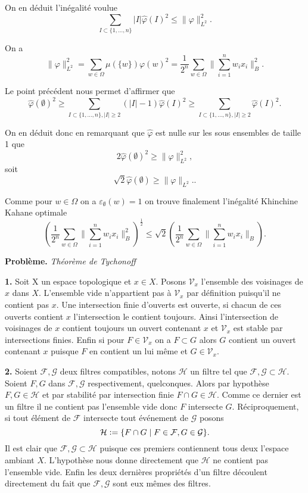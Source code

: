 \documentclass[12pt]{article}
\newcommand{\defeq}{\vcentcolon=}
\begin{document}
On en déduit l'inégalité voulue \[
\sum_{I \subset \{1, \ldots, n\}}|I|\hat{\varphi}(I)^{2} \le \|\varphi\|^{2}_{L^{2}} 
.\] 

On a \[
        \|\varphi\|_{L^{2}}^{2} = \sum_{w \in \Omega}\mu(\{w\})\varphi(w)^{2} = \frac{1}{2^{n}}\sum_{w \in \Omega}\|\sum_{i=1}^{n}w_{i}x_{i}\|^{2}_{B}
.\] 

Le point précédent nous permet d'affirmer que \[
        \hat{\varphi}(\emptyset)^{2} \ge \sum_{I \subset \{1, \ldots, n\}, |I| \ge 2} (|I|-1)\hat{\varphi}(I)^{2} \ge \sum_{I \subset \{1, \ldots, n\}, |I| \ge 2} \hat{\varphi}(I)^{2} 
.\] 

On en déduit donc en remarquant que $\hat{\varphi}$ est nulle sur les sous ensembles de taille 1 que \[
        2\hat{\varphi}(\emptyset)^{2} \ge \|\varphi\|^{2}_{L^{2}}
,\] soit \[
\sqrt{2}\hat{\varphi}(\emptyset) \ge \|\varphi\|_{L^{2}}.
.\]  

Comme pour $w \in \Omega$ on a $\varepsilon_{\emptyset}(w) = 1$ on trouve finalement l'inégalité Khinchine Kahane optimale \[
        (\frac{1}{2^{n}}\sum_{w\in\Omega}\|\sum_{i=1}^{n}w_{i}x_{i}\|^{2}_{B})^{\frac{1}{2}} \le \sqrt{2}(\frac{1}{2^{n}}\sum_{w \in \Omega}\|\sum_{i=1}^{n} w_{i}x_{i}\|_{B}) 
.\] 

\bigskip

\textbf{Problème.} \textit{Théorème de Tychonoff}
\medskip

\textbf{1.} Soit X un espace topologique et $x \in X$. Posons $\mathcal{V}_{x}$ l'ensemble des voisinages de $x$ dans $X$. L'ensemble vide n'appartient pas à $\mathcal{V}_{x}$ par définition puisqu'il ne contient pas $x$. Une intersection finie d'ouverts est ouverte, si chacun de ces ouverts contient $x$ l'intersection le contient toujours. Ainsi l'intersection de voisinages de $x$ contient toujours un ouvert contenant $x$ et $\mathcal{V}_{x}$ est stable par intersections finies. Enfin si pour $F \in \mathcal{V}_{x}$ on a $F \subset G$ alors $G$ contient un ouvert contenant $x$ puisque $F$ en contient un lui même et $G \in \mathcal{V}_{x}$. 

\medskip

\textbf{2.} Soient $\mathcal{F}, \mathcal{G}$ deux filtres compatibles, notons $\mathcal{H}$ un filtre tel que $\mathcal{F}, \mathcal{G} \subset \mathcal{H}$. Soient $F, G$ dans $\mathcal{F}, \mathcal{G}$ respectivement, quelconques. Alors par hypothèse $F, G \in \mathcal{H}$ et par stabilité par intersection finie $F \cap G \in \mathcal{H}$. Comme ce dernier est un filtre il ne contient pas l'ensemble vide donc $F$ intersecte $G$. Réciproquement, si tout élément de $\mathcal{F}$ intersecte tout événement de $\mathcal{G}$ posons \[
\mathcal{H} \defeq \{F \cap G \;|\; F \in \mathcal{F}, G \in \mathcal{G}\} 
.\] Il est clair que $\mathcal{F}, \mathcal{G} \subset \mathcal{H}$ puisque ces premiers contiennent tous deux l'espace ambiant $X$. L'hypothèse nous donne directement que $\mathcal{H}$ ne contient pas l'ensemble vide. Enfin les deux dernières propriétés d'un filtre découlent directement du fait que $\mathcal{F}, \mathcal{G}$ sont eux mêmes des filtres. 
\end{document}
